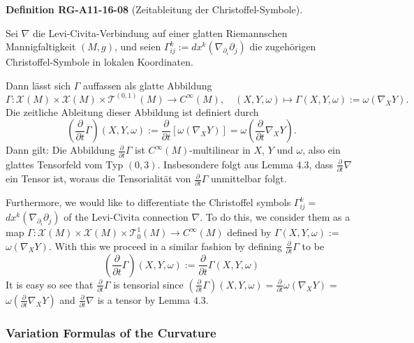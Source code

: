 \documentclass[10pt, letterpaper]{article}
\newcommand{\CustomHeading}[3]{%
  \par\medskip\noindent%
  \textbf{#1 #2} \textnormal{(#3)}.\enskip%
}
\newenvironment{DEF}[2]{\begin{unitbox}\CustomHeading{Definition}{#1}{#2}}{\end{unitbox}}
\begin{document}
\begin{DEF}{RG-A11-16-08}{Zeitableitung der Christoffel-Symbole}
Sei $\nabla$ die Levi-Civita-Verbindung auf einer glatten Riemannschen Mannigfaltigkeit $(M, g)$, und seien $\Gamma_{ij}^k := dx^k\left(\nabla_{\partial_i} \partial_j\right)$ die zugehörigen Christoffel-Symbole in lokalen Koordinaten.

Dann lässt sich $\Gamma$ auffassen als glatte Abbildung
\[
\Gamma: \mathscr{X}(M) \times \mathscr{X}(M) \times \mathscr{T}^{(0,1)}(M) \longrightarrow C^\infty(M), \quad (X,Y,\omega) \mapsto \Gamma(X,Y,\omega) := \omega\left(\nabla_X Y\right).
\]
Die zeitliche Ableitung dieser Abbildung ist definiert durch
\[
\left( \frac{\partial}{\partial t} \Gamma \right)(X, Y, \omega) := \frac{\partial}{\partial t} \left[ \omega\left( \nabla_X Y \right) \right] = \omega\left( \frac{\partial}{\partial t} \nabla_X Y \right).
\]
Dann gilt: Die Abbildung $\frac{\partial}{\partial t} \Gamma$ ist $C^\infty(M)$-multilinear in $X$, $Y$ und $\omega$, also ein glattes Tensorfeld vom Typ $(0,3)$. Insbesondere folgt aus Lemma 4.3, dass $\frac{\partial}{\partial t} \nabla$ ein Tensor ist, woraus die Tensorialität von $\frac{\partial}{\partial t} \Gamma$ unmittelbar folgt.
\end{DEF}



Furthermore, we would like to differentiate the Christoffel symbols $\Gamma_{i j}^{k}=$ $d x^{k}\left(\nabla_{\partial_{i}} \partial_{j}\right)$ of the Levi-Civita connection $\nabla$. To do this, we consider them as a map $\Gamma: \mathscr{X}(M) \times \mathscr{X}(M) \times \mathscr{T}_{0}^{1}(M) \rightarrow C^{\infty}(M)$ defined by $\Gamma(X, Y, \omega):=$ $\omega\left(\nabla_{X} Y\right)$. With this we proceed in a similar fashion by defining $\frac{\partial}{\partial t} \Gamma$ to be
$$
\left(\frac{\partial}{\partial t} \Gamma\right)(X, Y, \omega):=\frac{\partial}{\partial t} \Gamma(X, Y, \omega)
$$
It is easy so see that $\frac{\partial}{\partial t} \Gamma$ is tensorial since $\left(\frac{\partial}{\partial t} \Gamma\right)(X, Y, \omega)=\frac{\partial}{\partial t} \omega\left(\nabla_{X} Y\right)=$ $\omega\left(\frac{\partial}{\partial t} \nabla_{X} Y\right)$ and $\frac{\partial}{\partial t} \nabla$ is a tensor by Lemma 4.3.





\subsubsection*{Variation Formulas of the Curvature}
\end{document}

